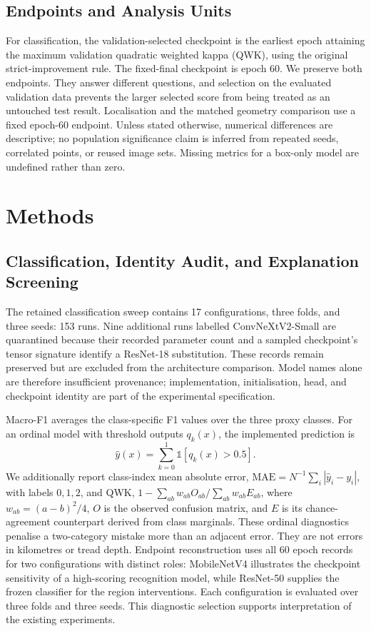 \subsection{Endpoints and Analysis Units}
For classification, the validation-selected checkpoint is the earliest epoch attaining the maximum validation quadratic weighted kappa (QWK), using the original strict-improvement rule. The fixed-final checkpoint is epoch 60. We preserve both endpoints. They answer different questions, and selection on the evaluated validation data prevents the larger selected score from being treated as an untouched test result. Localisation and the matched geometry comparison use a fixed epoch-60 endpoint. Unless stated otherwise, numerical differences are descriptive; no population significance claim is inferred from repeated seeds, correlated points, or reused image sets. Missing metrics for a box-only model are undefined rather than zero.

\section{Methods}
\label{sec:methods}
\subsection{Classification, Identity Audit, and Explanation Screening}
The retained classification sweep contains 17 configurations, three folds, and three seeds: 153 runs. Nine additional runs labelled ConvNeXtV2-Small are quarantined because their recorded parameter count and a sampled checkpoint's tensor signature identify a ResNet-18 substitution. These records remain preserved but are excluded from the architecture comparison. Model names alone are therefore insufficient provenance; implementation, initialisation, head, and checkpoint identity are part of the experimental specification.

Macro-F1 averages the class-specific F1 values over the three proxy classes. For an ordinal model with threshold outputs $q_k(x)$, the implemented prediction is
\begin{equation}
\hat y(x)=\sum_{k=0}^{1}\mathbb{1}[q_k(x)>0.5].
\label{eq:ordinal}
\end{equation}
We additionally report class-index mean absolute error, $\mathrm{MAE}=N^{-1}\sum_i|\hat y_i-y_i|$, with labels $0,1,2$, and QWK, $1-\sum_{ab}w_{ab}O_{ab}/\sum_{ab}w_{ab}E_{ab}$, where $w_{ab}=(a-b)^2/4$, $O$ is the observed confusion matrix, and $E$ is its chance-agreement counterpart derived from class marginals. These ordinal diagnostics penalise a two-category mistake more than an adjacent error. They are not errors in kilometres or tread depth. Endpoint reconstruction uses all 60 epoch records for two configurations with distinct roles: MobileNetV4 illustrates the checkpoint sensitivity of a high-scoring recognition model, while ResNet-50 supplies the frozen classifier for the region interventions. Each configuration is evaluated over three folds and three seeds. This diagnostic selection supports interpretation of the existing experiments.

